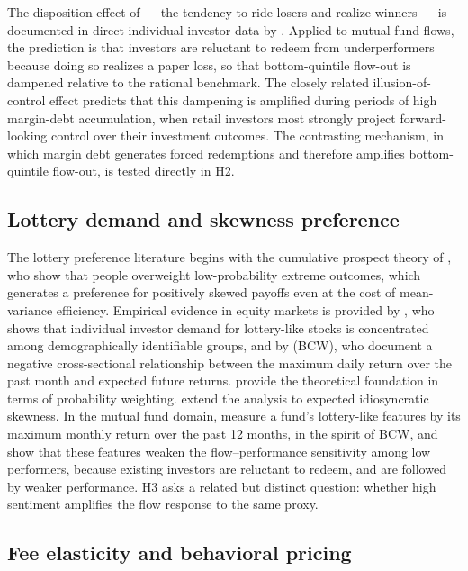 \documentclass[12pt, oneside]{report}
\begin{document}
\noindent The disposition effect of \textcite{ShefrinStatman1985} ---
the tendency to ride losers and realize winners --- is documented in
direct individual-investor data by \textcite{Odean1998}. Applied to
mutual fund flows, the prediction is that investors are reluctant to
redeem from underperformers because doing so realizes a paper loss, so
that bottom-quintile flow-out is dampened relative to the rational
benchmark. The closely related illusion-of-control effect
predicts that this dampening is amplified during periods of high
margin-debt accumulation, when retail investors most strongly project
forward-looking control over their investment outcomes. The contrasting
\textcite{BrunnermeierPedersen2009} mechanism, in which margin debt
generates forced redemptions and therefore amplifies bottom-quintile
flow-out, is tested directly in H2.

\subsection{Lottery demand and skewness preference}
\label{sec:lottery_lit}

\noindent The lottery preference literature begins with the cumulative
prospect theory of \textcite{TverskyKahneman1992}, who show that
people overweight low-probability extreme outcomes, which generates a
preference for positively skewed payoffs even at the cost of
mean-variance efficiency. Empirical evidence
in equity markets is provided by \textcite{Kumar2009}, who shows that
individual investor demand for lottery-like stocks is concentrated among
demographically identifiable groups, and by
\textcite{BaliCakiciWhitelaw2011} (BCW), who document a negative cross-sectional relationship 
between the maximum daily return over the past
month and expected future returns. \textcite{BarberisHuang2008} provide
the theoretical foundation in terms of probability weighting.
\textcite{Boyer2010} extend the analysis to expected idiosyncratic
skewness. In the mutual fund domain, \textcite{ChengEtal2025} measure a
fund's lottery-like features by its maximum monthly return over the past
12 months, in the spirit of BCW, and show that these features weaken the
flow--performance sensitivity among low performers, because existing
investors are reluctant to redeem, and are followed by weaker
performance. H3 asks a related but distinct question: whether high
sentiment amplifies the flow response to the same proxy.

\subsection{Fee elasticity and behavioral pricing}
\label{sec:fee_lit}
\end{document}
